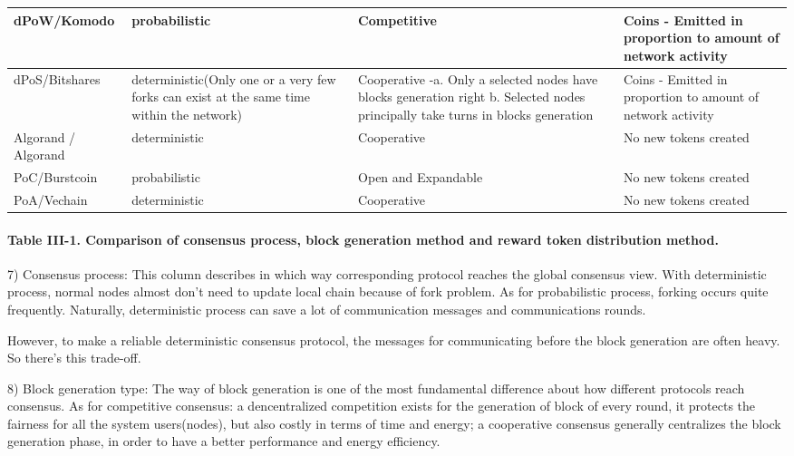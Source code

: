 \documentclass[doublespacing]{bmcart}
\begin{document}
\begin{CJK*}{UTF8}{gbsn}
\begin{tabular}{p{2cm}p{3cm}p{3cm}p{3cm}}
dPoW/Komo\-do  
& probabilistic
& Competitive 
&  Coins - Emitted in proportion to amount of network activity\\ \hline

dPoS/\newline Bitshares  
& deterministic(Only one or a very few forks can exist at the same time within the network)
& Cooperative -\newline a. Only a selected nodes have blocks generation right \newline b. Selected nodes principally take turns in blocks generation 
& Coins - Emitted in proportion to amount of network activity \\ \hline

Algorand / Algorand
& deterministic 
& Cooperative 
& No new tokens created \\ \hline

PoC/Burst\-coin & probabilistic & Open and Expandable & No new tokens created \\ \hline
PoA/Vechain & deterministic & Cooperative & No new tokens created \\ \hline
\end{tabular}
\paragraph{Table III-1. Comparison of consensus process, block generation method and reward token distribution method.}
	 
7) Consensus process: This column describes in which way corresponding protocol reaches the global consensus view. With deterministic process, normal nodes almost don't need to update local chain because of fork problem. As for probabilistic process, forking occurs quite frequently. Naturally, deterministic process can save a lot of communication messages and communications rounds.
 
 However, to make a reliable deterministic consensus protocol, the messages for communicating before the block generation are often heavy. So there's this trade-off.
	 
8) Block generation type: The way of block generation is one of the most fundamental difference about how different protocols reach consensus. As for competitive consensus: a dencentralized competition exists for the generation of block of every round, it protects the fairness for all the system users(nodes), but also costly in terms of time and energy; a cooperative consensus generally centralizes the block generation phase, in order to have a better performance and energy efficiency.



\end{CJK*}
\end{document}
